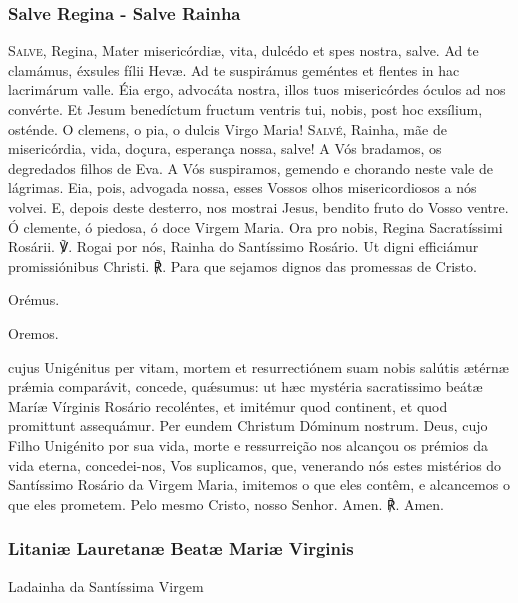 \subsubsection{Salve Regina - Salve Rainha}
\begin{paracol}{2}
\lettrine[lines=4,loversize=-.15,lraise=.15]{{\bg S}}{\redx alve,} Regina, Mater misericórdiæ, vita, dulcédo et spes nostra, salve. Ad te clamámus, éxsules fílii Hevæ. Ad te suspirámus geméntes et flentes in hac lacrimárum valle. Éia ergo, advocáta nostra, illos tuos misericórdes óculos ad nos convérte. Et Jesum benedíctum fructum ventris tui, nobis, post hoc exsílium, osténde. O clemens, o pia, o dulcis Virgo Maria!
\switchcolumn
\lettrine[lines=4,loversize=-.15,lraise=.15]{{\bg S}}{\redx alvé,} Rainha, mãe de misericórdia, vida, doçura, esperança nossa, salve! A Vós bradamos, os degredados filhos de Eva. A Vós suspiramos, gemendo e chorando neste vale de lágrimas. Eia, pois, advogada nossa, esses Vossos olhos misericordiosos a nós volvei. E, depois deste desterro, nos mostrai Jesus, bendito fruto do Vosso ventre. Ó clemente, ó piedosa, ó doce Virgem Maria.
 Ora pro nobis, Regina Sacratíssimi Rosárii.
\switchcolumn
{\redx ℣.} Rogai por nós, Rainha do Santíssimo Rosário.
 Ut digni efficiámur promissiónibus Christi.
\switchcolumn
{\redx ℟.} Para que sejamos dignos das promessas de Cristo.
\switchcolumn*
\begin{nscenter} {\redx Orémus.} \end{nscenter}
\switchcolumn
\begin{nscenter} {\redx Oremos.} \end{nscenter}
\switchcolumn*
{}cujus Unigénitus per vitam, mortem et resurrectiónem suam nobis salútis ætérnæ prǽmia comparávit, concede, quǽsumus: ut hæc mystéria sacratissimo beátæ Maríæ Vírginis Rosário recoléntes, et imitémur quod continent, et quod promittunt assequámur. Per eundem Christum Dóminum
nostrum.
\switchcolumn
{}Deus, cujo Filho Unigénito por sua vida, morte e ressurreição nos alcançou os prémios da vida eterna, concedei-nos, Vos suplicamos, que, venerando nós estes mistérios do Santíssimo Rosário da Virgem Maria, imitemos o que eles contêm, e alcancemos o que eles prometem. Pelo mesmo Cristo, nosso Senhor.
 Amen.
\switchcolumn
{\redx ℟.} Amen.
\end{paracol}

\newpage

\subsubsection{Litaniæ Lauretanæ Beatæ Mariæ Virginis}
\begin{nscenter}Ladainha da Santíssima Virgem\end{nscenter}

